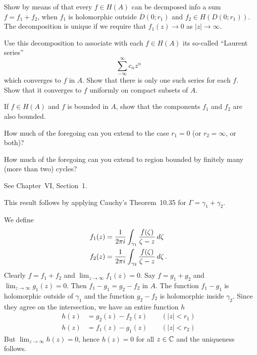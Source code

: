 \begin{enumerate}
\begin{excopy}
\begin{itemize}
 Show by means of  that every \(f\in H(A)\)
can be decmposed info a sum \(f=f_1+f_2\), when \(f_1\) is holomorphic
outside \(\overline{D}(0;r_1)\)
and  \(f_2 \in H(D(0;r_1))\).
The decomposition is unique if we require that 
\(f_1(z)\to 0\) as \(|z|\to\infty\).

 Use this decomposition to associate with each \(f\in H(A)\) its
so-called
``Laurent series''
\begin{equation*}
\sum_{-\infty}^\infty c_n z^n
\end{equation*}
which converges to $f$ in $A$. Show that there is only one such series for 
each $f$. Show that it converges to $f$ uniformly on compact subsets of $A$.

 If \(f\in H(A)\) and $f$ is bounded in $A$, show that the components
\(f_1\) and \(f_2\) are also bounded.

 How much of the foregoing can you extend to the case \(r_1=0\)
(or \(r_2=\infty\), or both)?

 How much of the foregoing can you extend  to region bounded 
by finitely many (more than two) cycles?
\end{itemize}
\end{excopy}

See \cite{Gamelin2003} Chapter~VI, Section~1.
\begin{itemize}

This result follows by applying  Cauchy's Theorem~10.35
for \(\Gamma = \gamma_1 + \gamma_2\).

We define
\begin{align*}
f_1(z) &= \frac{1}{2\pi i} \int_{\gamma_1} \frac{f(\zeta)}{\zeta - z}\,d\zeta \\
f_2(z) &= \frac{1}{2\pi i} \int_{\gamma_2} \frac{f(\zeta)}{\zeta - z}\,d\zeta\,.
\end{align*}
Clearly \(f = f_1 +f_2\) and \(\lim_{z\to\infty} f_1(z) = 0\).
Say  \(f = g_1 +g_2\) and \(\lim_{z\to\infty} g_1(z) = 0\).
Then \(f_1 - g_1 = g_2 - f_2\) in $A$.
The function \(f_1 - g_1\) is holomorphic outside of \(\gamma_1\)
and the function \(g_2 - f_2\) is holomorphic inside \(\gamma_2\).
Since they agree on the intersection, we have an entire function $h$
\begin{align*}
h(z) &= g_2(z) - f_2(z) \qquad (|z| < r_1) \\
h(z) &= f_1(z) - g_1(z) \qquad (|z| < r_2)
\end{align*}
But \(\lim_{z\to\infty} h(z) = 0\), hence \(h(z)=0\) for all \(z\in\mathbb{C}\)
and the uniqueness follows.


\end{itemize}
\end{enumerate}
